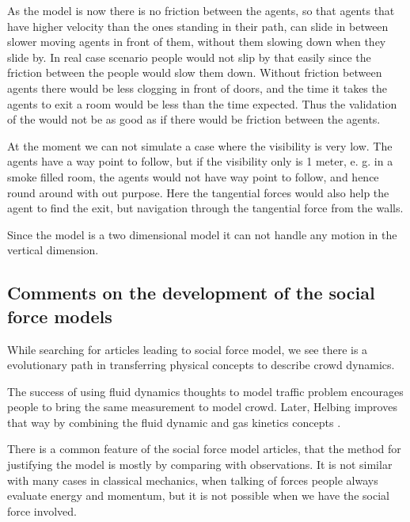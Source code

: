 As the model is now there is no friction between the agents, so that agents 
that have higher velocity than the ones standing in their path, can slide in 
between slower moving agents in front of them, without them slowing down when 
they slide by. In real case scenario people would not slip by that easily 
since the friction between the people would slow them down.  Without friction 
between agents there would be less clogging in front of doors, and the time it 
takes the agents to exit a room would be less than the time expected. Thus the 
validation of the would not be as good as if there would be friction between 
the agents.

At the moment we can not simulate a case where the visibility is very low. The 
agents have a way point to follow, but if the visibility only is 1 meter, e. 
g. in a smoke filled room, the  agents would not have way point to follow, and 
hence round around with out purpose. Here the tangential forces would also 
help the agent to find the exit, but navigation through the tangential force 
from the walls.

Since the model is a two dimensional model it can not handle any motion in the 
vertical dimension. 

\subsection{Comments on the development of the social force models}
\label{subsec:development}
While searching for articles leading to social force model, we see there is a 
evolutionary path in transferring physical concepts to describe crowd dynamics.

The success of using fluid dynamics thoughts to model traffic problem encourages 
people to bring the same measurement to model crowd. Later, Helbing improves that 
way by combining the fluid dynamic and gas kinetics concepts \cite{social-force}. 


There is a common feature of the social force model articles, that the method for 
justifying the model is mostly by comparing with observations. It is not 
similar with many cases in classical mechanics, when talking of forces people 
always evaluate energy and momentum, but it is not possible when we have 
the social force involved.


